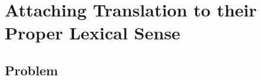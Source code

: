 \documentclass{beamer}
\begin{document}

\section{Attaching Translation to their Proper Lexical Sense}

\subsection{Problem}
\end{document}
